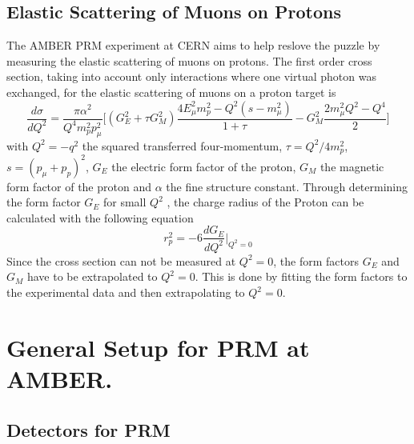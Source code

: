 \subsection{Elastic Scattering of Muons on Protons}
The AMBER PRM experiment at CERN aims to help reslove the puzzle by measuring the elastic scattering of muons on protons.
The first order cross section, taking into account only interactions where one virtual photon was exchanged, 
for the elastic scattering of muons on a proton target is 
\begin{equation}
\label{eq:cross_section}
\frac{d\sigma}{dQ^2} = \frac{\pi \alpha^2}{Q^4 m_p^2 p_\mu^2} \bigg[ \left( G_E^2 + \tau G_M^2 \right) \frac{ 4E_\mu^2 m_p^2 
- Q^2 (s - m_\mu^2)}{1 + \tau }  - G_M^2 \frac{ 2m_\mu^2 Q^2 - Q^4}{2} \bigg]
\end{equation}
with  $Q^2 = -q^2$ 	the squared transferred four-momentum, $\tau = Q^2 / 4m_p^2$, $s = (p_\mu + p_p)^2$, 
 $G_E$ the electric form factor of the proton,
  $G_M$ the magnetic form factor of the proton and $\alpha$ the fine structure constant.\autocite{intentAmber}
Through determining the form factor $G_E$ for small $Q^2$ , the charge radius of the Proton can be calculated with the following equation\autocite{intentAmber}
\begin{equation}
\label{eq:charge_radius}
r_p^2 = -6 \frac{dG_E}{dQ^2} \bigg|_{Q^2 = 0}
\end{equation}
Since the cross section can not be measured at $Q^2 = 0$, the form factors $G_E$ and $G_M$ have to be extrapolated to $Q^2 = 0$.
This is done by fitting the form factors to the experimental data and then extrapolating to $Q^2 = 0$.\autocite{intentAmber}
\section{General Setup for PRM at AMBER.}\label{sec:general_setup}
\subsection{Detectors for PRM}

